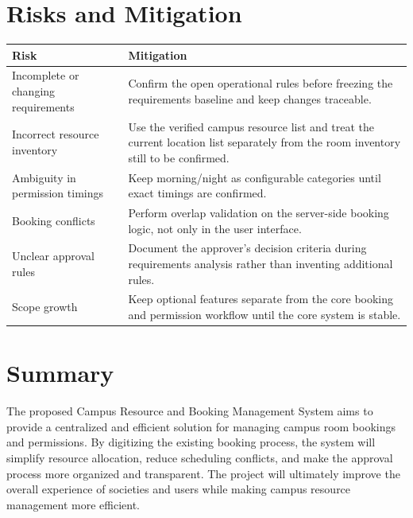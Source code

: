 \documentclass[12pt]{article}
\begin{document}
\section{Risks and Mitigation}
\begin{tabular}{|p{6cm}|p{9cm}|}
\hline
\textbf{Risk} & \textbf{Mitigation} \\
\hline
Incomplete or changing requirements & Confirm the open operational rules before freezing the requirements baseline and keep changes traceable. \\
\hline
Incorrect resource inventory & Use the verified campus resource list and treat the current location list separately from the room inventory still to be confirmed. \\
\hline
Ambiguity in permission timings & Keep morning/night as configurable categories until exact timings are confirmed. \\
\hline
Booking conflicts & Perform overlap validation on the server-side booking logic, not only in the user interface. \\
\hline
Unclear approval rules & Document the approver’s decision criteria during requirements analysis rather than inventing additional rules. \\
\hline
Scope growth & Keep optional features separate from the core booking and permission workflow until the core system is stable. \\
\hline
\end{tabular}

\section{Summary}
The proposed Campus Resource and Booking Management System aims to provide a centralized and efficient solution for managing campus room bookings and permissions. By digitizing the existing booking process, the system will simplify resource allocation, reduce scheduling conflicts, and make the approval process more organized and transparent. The project will ultimately improve the overall experience of societies and users while making campus resource management more efficient.
\end{document}
